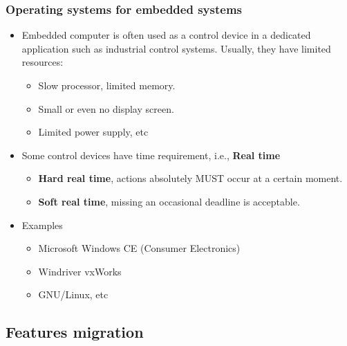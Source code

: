 \documentclass[CJKutf8,xcolor=pdftex,dvipsnames,table]{beamer}
\begin{document}
\begin{CJK*}{UTF8}{song}
  \begin{frame}
    \frametitle{Operating systems for embedded systems} \pause
	  \begin{itemize}
	  \item{Embedded computer is often used as a control device in a dedicated application such as industrial control systems. Usually, they have limited resources: } \pause
	    \begin{itemize}
	    \item{Slow processor, \pause limited memory.} \pause
	    \item{Small or even no display screen.} \pause
	    \item{Limited power supply, etc} \pause
	    \end{itemize}
	  \item{Some control devices have time requirement, i.e., \textbf{Real time}} \pause
	    \begin{itemize}
	    \item{\textbf{Hard real time}, actions absolutely MUST occur at a certain moment.} \pause
	    \item{\textbf{Soft real time}, missing an occasional deadline is acceptable.} \pause
	    \end{itemize}
	  \item{Examples} \pause
	    \begin{itemize}
	    \item{Microsoft Windows CE (Consumer Electronics)} \pause
	    \item{Windriver vxWorks} \pause
	    \item{GNU/Linux, etc}
	    \end{itemize}
	  \end{itemize}
  \end{frame}

  \subsection{Features migration}


\end{CJK*}
\end{document}
